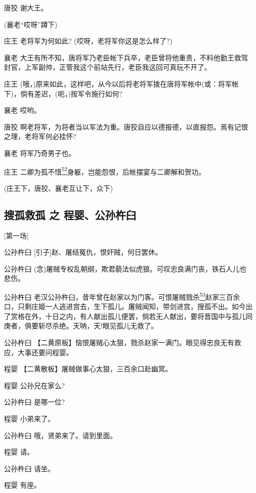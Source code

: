唐狡 谢大王。

(襄老``哎呀''蹲下)

庄王 老将军为何如此? (哎呀，老将军你这是怎么样了?)

襄老
大王有所不知，唐将军乃老臣帐下兵卒，老臣曾将他重责，不料他勤王救驾封官，上军副帅，正管我这个前站先行，老臣我这回可真玩不开了。

庄王
(哦，)原来如此，这样吧，从今以后将老将军拨在唐将军帐中(或：将军帐下)，倘有差迟，(呃，)按军令施行如何?

襄老 哎哟。

唐狡
啊老将军，为将者当以军法为重。唐狡自应以德报德，以直报怨。焉有记恨之理，老将军何必挂怀?

襄老 将军乃奇男子也。

庄王
二卿为孤不惜\protect\hyperlink{fn52}{\textsuperscript{52}}身躯，岂能怨恨，后帐摆宴与二卿解和贺功。

(庄王下，唐狡、襄老互让下，众下)

\hypertarget{ux641cux5b64ux6551ux5b64-ux4e4b-ux7a0bux5a74ux516cux5b59ux6775ux81fc}{%
\subsection{搜孤救孤 之
程婴、公孙杵臼}\label{ux641cux5b64ux6551ux5b64-ux4e4b-ux7a0bux5a74ux516cux5b59ux6775ux81fc}}

{[}第一场{]}

公孙杵臼 {[}引子{]}赵、屠结冤仇，恨奸贼，何日罢休。

公孙杵臼
(念)屠贼专权乱朝纲，欺君藐法似虎狼。可叹忠良满门丧，铁石人儿也悲伤。

公孙杵臼
老汉公孙杵臼，昔年曾在赵家以为门客。可恨屠贼戮杀\protect\hyperlink{fn53}{\textsuperscript{53}}赵家三百余口，只剩庄姬一人逃进宫去，生下孤儿。屠贼闻知，带剑进宫，搜孤不出。如今出了赏格在外，十日之内，有人献出孤儿便罢，倘若无人献出，要将晋国中与孤儿同庚者，俱要斩尽杀绝。天呐，天!眼见孤儿无救了。

公孙杵臼
【二黄原板】恼恨屠贼心太狠，戮杀赵家一满门。眼见得忠良无有救应，大事还要问程婴。

程婴 【二黄散板】屠贼做事心太狠，三百余口赴幽冥。

程婴 公孙兄在家么?

公孙杵臼 是哪一位?

程婴 小弟来了。

公孙杵臼 哦，贤弟来了。请到里面。

程婴 请。

公孙杵臼 请坐。

程婴 有座。

